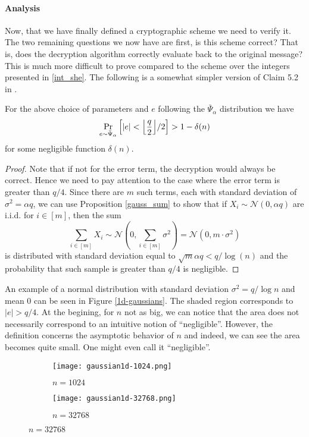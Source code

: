 \paragraph{Analysis}
Now, that we have finally defined a cryptographic scheme we need to verify it. The two remaining questions we now have are first, is this scheme correct? That is, does the decryption algorithm correctly evaluate back to the original message? This is much more difficult to prove compared to the scheme over the integers presented in \ref{int_she}. The following is a somewhat simpler version of Claim 5.2 in \cite{regev}.
\begin{lemma}[Correctness]
	For the above choice of parameters and $e$ following the $\bar{\Psi}_{\alpha}$ distribution we have
	\begin{equation} \Pr_{e \sim \bar{\Psi}_{\alpha}} \Big[ |e| < \Bigl \lfloor \frac{q}{2} \Bigr \rfloor /2 \Big] > 1 - \delta(n) \end{equation}
    for some negligible function $\delta(n)$.
\end{lemma}
\begin{proof}
	Note that if not for the error term, the decryption would always be correct. Hence we need to pay attention to the case where the error term is greater than $q/4$. Since there are $m$ such terms, each with standard deviation of $\sigma^2 = \alpha q$, we can use Proposition \ref{gauss_sum} to show that if $X_i \sim \mathcal{N}(0, \alpha q)$ are i.i.d. for $i \in [m]$, then the sum
	\[ \sum_{i \in [m]} X_i \sim \mathcal{N}(0, \sum_{i \in [m]} \sigma^2) = \mathcal{N}(0, m \cdot \sigma^2)\]
	is distributed with standard deviation equal to $\sqrt{m} \alpha q < q / \log(n)$ and the probability that such sample is greater than $q/4$ is negligible.
\end{proof}
An example of a normal distribution with standard deviation $\sigma^2 = q/\log n$ and mean 0 can be seen in Figure \ref{1d-gaussians}. The shaded region corresponds to $|e| > q/4$. At the begining, for $n$ not as big, we can notice that the area does not necessarily correspond to an intuitive notion of ``negligible''. However, the definition concerns the asymptotic behavior of $n$ and indeed, we can see the area becomes quite small. One might even call it ``negligible''.%

\begin{figure}
	\caption{1 dimensional Gaussian with standard deviation $\sigma^2 = q/\log n$ for:}
	\label{1d-gaussians}
	\centering
	\begin{subfigure}{.5\textwidth} 
		\centering
		\texttt{[image: gaussian1d-1024.png]}
		\caption{$n = 1024$}
	\end{subfigure}%
	\begin{subfigure}{.5\textwidth}
		\centering
		\texttt{[image: gaussian1d-32768.png]}
		\caption{$n = 32768$}
	\end{subfigure}
\end{figure}

